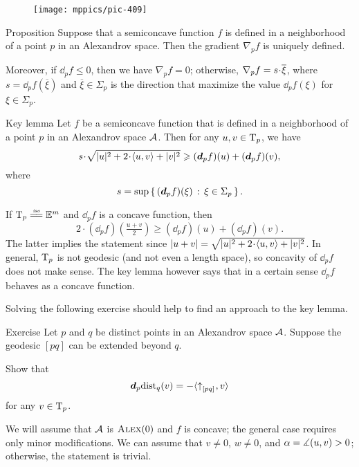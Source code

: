 \begin{figure}[ht!]
\centering
\texttt{[image: mppics/pic-409]}
\end{figure}

\begin{thm}{Proposition}\label{prop:grad-exist}
Suppose that a semiconcave function $f$ is defined in a neighborhood of a point $p$ in an Alexandrov space.
Then the gradient $\nabla_pf$ is uniquely defined.

Moreover, if $\dd_pf\le 0$, then we have $\nabla_pf=0$;
otherwise, $\nabla_pf\z=s\cdot \overline{\xi}$, where 
$s= \dd_pf(\overline{\xi})$
and
$\overline{\xi}\in \Sigma_p$ is the direction that maximize the value $\dd_pf(\xi)$ for $\xi\in \Sigma_p$.
\end{thm}


\begin{thm}{Key lemma}\label{lem:ohta} 
Let $f$ be a semiconcave function that is defined in a neighborhood of a point $p$
in an Alexandrov space $\mathcal{A}$. 
Then for any $u,v\in \mathrm{T}_p$, we have
\[s\cdot \sqrt{|u|^2+2\cdot\<u,v\> +|v|^2}
\ge 
(\dd_p f)(u)+(\dd_p f)(v),\]
where
\[s=\sup\left\{\,{(\bm{d}_p f)(\xi)}\,:\,{\xi\in\Sigma_p}\,\right\}.\]

\end{thm}

If $\T_p\iso\EE^m$ and $\dd_p f$ is a concave function,
then
\[2\cdot(\dd_p f)(\tfrac{u+v}2)\ge(\dd_p f)(u)+(\dd_p f)(v).\]
The latter implies the statement since $|u+v|=\sqrt{|u|^2+2\cdot\<u,v\> +|v|^2}$.
In general, $\mathrm{T}_p$ is not geodesic (and not even a length space), so concavity of $\dd_p f$ does not make  sense.
The key lemma however says  that in a certain sense $\dd_p f$ behaves as a concave function.

Solving the following exercise should help to find an approach to the key lemma.

\begin{thm}{Exercise}\label{ex:d(distfun):==}
Let $p$ and $q$ be distinct points in an Alexandrov space $\mathcal{A}$.
Suppose the geodesic $[pq]$ can be extended beyond $q$.

Show that
\[\bm{d}_p\mathrm{dist}_q(v)= -\langle{\uparrow}_{[{p}{q}]_{{}}},v\rangle\]
for any $v\in\mathrm{T}_p$.
\end{thm}

We will assume that $\mathcal{A}$ is $\textsc{Alex}(0)$ and $f$ is concave;
the general case requires only minor modifications.
We can assume that $v\ne 0$, $w\ne 0$, and $\alpha=\measuredangle(u,v)>0$; otherwise, the statement is trivial.

